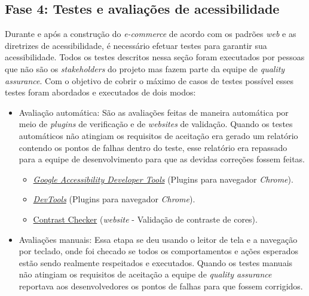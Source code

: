 \subsection{Fase 4: Testes e avaliações de acessibilidade}
{Durante e após a construção do \textit{e-commerce} de acordo com os
padrões \textit{web} e as diretrizes de acessibilidade, é necessário efetuar testes para garantir sua acessibilidade. Todos os testes descritos nessa seção foram executados por pessoas que não são os \textit{stakeholders} do projeto mas fazem parte da equipe de \textit{quality assurance}. Com o objetivo de cobrir o máximo de casos de testes possível esses testes foram abordados e executados de dois modos: 
\begin{itemize}
\item Avaliação automática: São as avaliações feitas de maneira automática por meio de \textit{plugins} de verificação e de \textit{websites} de validação. Quando os testes automáticos não atingiam os requisitos de aceitação era gerado um relatório contendo os pontos de falhas dentro do teste, esse relatório era repassado para a equipe de desenvolvimento para que as devidas correções fossem feitas.
\begin{itemize}
    \item \href{https://chrome.google.com/webstore/detail/accessibility-developer-t/fpkknkljclfencbdbgkenhalefipecmb?hl=pt-BR}{\textit{Google Accessibility Developer Tools}} ({Plugins} para navegador \textit{Chrome}).
    \item \href{https://developer.chrome.com/docs/devtools/}{\textit{DevTools}} ({Plugins} para navegador \textit{Chrome}).
    \item \href{https://contrastchecker.com/}{Contrast Checker} (\textit{website} - Validação de contraste de cores).
\end{itemize}
\item Avaliações manuais: Essa etapa se deu usando o leitor de tela e a navegação por teclado, onde foi checado se todos os comportamentos e ações esperados estão sendo realmente respeitados e executados. Quando os testes manuais não atingiam os requisitos de aceitação a equipe de \textit{quality assurance} reportava aos desenvolvedores os pontos de falhas para que fossem corrigidos.
\end{itemize}


}

